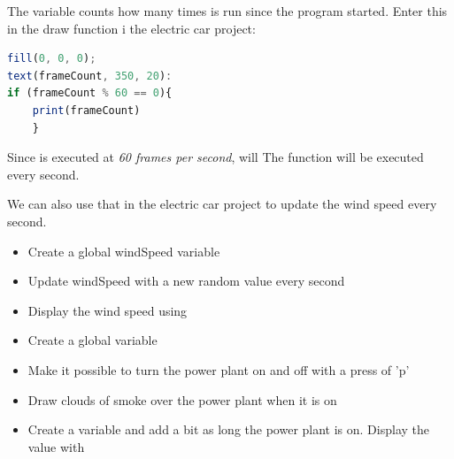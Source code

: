 \begin{exercisebox}[adjusted title= Changing wind speed]
The variable  counts how many times  is
run since the program started. Enter this in the draw function i
the electric car project:


\begin{lstlisting}[language=JavaScript]
fill(0, 0, 0);
text(frameCount, 350, 20):
if (frameCount % 60 == 0){
    print(frameCount)
    }
\end{lstlisting}



\noindent
Since  is executed at \textit{60 frames per second}, will
The  function will be executed every second.

\vspace{2mm}
\noindent
We can also use that in the electric car project to update
the wind speed every second.
 \begin{itemize}
 \item Create a global windSpeed ​​variable
 \item Update windSpeed ​​with a new random value every second
 \item Display the wind speed using 
 \end{itemize}
 \begin{itemize}
 \item Create a global variable 
 \item Make it possible to turn the power plant on and off with a press of 'p'
 \item Draw clouds of smoke over the power plant when it is on
 \item Create a variable  and add a bit as long
 the power plant is on. Display the value with 
 \end{itemize}
 \end{exercisebox}


